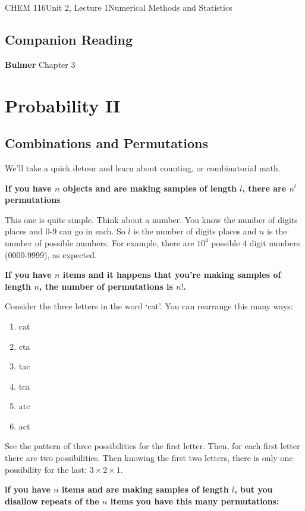\documentclass{article}
\begin{document}
\begin{tdoc}{CHEM 116}{Unit 2, Lecture 1}{Numerical Methods and Statistics}

  \subsection*{Companion Reading}
  \textbf{Bulmer} Chapter 3


  \section{Probability II}

  \subsection{Combinations and Permutations}

  We'll take a quick detour and learn about counting, or combinatorial math.

  {\bf If you have $n$ objects and are making samples of length $l$, there are $n^l$ permutations}

  This one is quite simple. Think about a number. You know the number
  of digits places and 0-9 can go in each. So $l$ is the number of
  digits places and $n$ is the number of possible numbers. For example, there
  are $10^4$ possible 4 digit numbers (0000-9999), as expected.

  {\bf  If you have $n$ items and it happens that you're making samples of length $n$, the number of permutations is $n!$. }

  Consider the three letters in the word `cat'. You can rearrange this many ways:

  \begin{enumerate}
  \item cat
  \item cta
  \item tac
  \item tca
  \item atc
  \item act
  \end{enumerate}

  See the pattern of three possibilities for the first letter. Then,
  for each first letter there are two possibilities. Then knowing the
  first two letters, there is only one possibility for the last: $3 \times 2 \times 1$.

  {\bf if you have $n$ items and are making samples of length $l$, but you disallow repeats of the $n$ items you have this many permutations:}


\end{tdoc}
\end{document}
